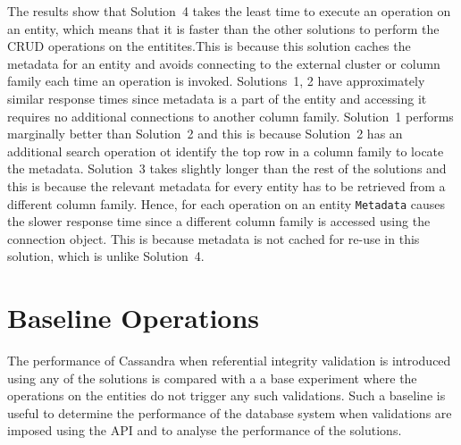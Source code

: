 The results show that Solution~4 takes the least time to execute an operation on
an entity, which means that it is faster than the other solutions to perform the
\ac{CRUD} operations on the entitites.This is because this solution caches the
metadata for an entity and avoids connecting to the external cluster or column
family each time an operation is invoked. Solutions~1, 2 have
approximately similar response times since metadata is a part of the entity and
accessing it requires no additional connections to another column family.
Solution~1 performs marginally better than Solution~2 and this is because
Solution~2 has an additional search operation ot identify the top row in a
column family to locate the metadata.
Solution~3 takes slightly longer than the rest of the solutions and this is
because 
the relevant metadata for every  entity has to be retrieved from a different
column family. Hence, for each operation on an entity \texttt{Metadata} causes
the slower response time since a different column family is accessed using the
connection object.
This is because metadata is not cached for re-use in this solution, which is
unlike Solution~4.

%  





\section{Baseline Operations}

The performance of Cassandra when referential
integrity validation is introduced using any of the solutions is compared with a
a base experiment where the operations on the entities do not trigger any
such validations. Such a baseline is useful to determine the
performance of the database system when validations are imposed using the
\ac{API} and to analyse the performance of the solutions.

